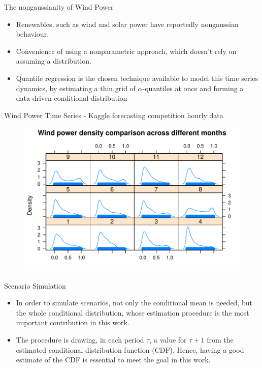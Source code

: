 \documentclass[11pt]{beamer}
\begin{document}
\begin{frame}{The nongaussianity of Wind Power}

	\begin{itemize}
	
	\item
	Renewables, such as wind and solar power have reportedly nongaussian behaviour.
	\item
	Convenience of using a nonparametric approach, which doesn't rely on assuming a distribution.
	\item
	Quantile regression is the chosen technique available to model this time series dynamics, by estimating a thin grid of $\alpha$-quantiles at once and forming a data-driven conditional distribution
	\end{itemize}
	
\end{frame}


\begin{frame}{Wind Power Time Series - Kaggle forecasting competition hourly data}

	\begin{figure}
	\centering
	\includegraphics[width=0.9\linewidth]{Images/density}
	\end{figure}

\end{frame}

\begin{frame}{Scenario Simulation}

	\begin{itemize}
		\item In order to simulate scenarios, not only the conditional mean is needed, but the whole conditional distribution, whose estimation procedure is the most important contribution in this work.
		
		\item The procedure is drawing, in each period $\tau$, a value for $\tau+1$ from the estimated conditional distribution function (CDF). Hence, having a good estimate of the CDF is essential to meet the goal in this work. 


	\end{itemize}
\end{frame}
\end{document}
